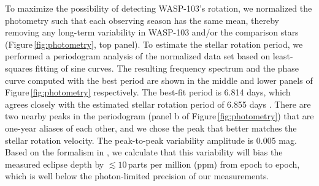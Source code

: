 \documentclass[twocolumn, trackchanges]{aastex61}
\begin{document}

To maximize the possibility of detecting WASP-103's rotation, we normalized the
photometry such that each observing season has the same mean, thereby removing
any long-term variability in WASP-103 and/or the comparison stars
(Figure\,\ref{fig:photometry}, top panel).  To estimate the stellar rotation
period, we performed a periodogram analysis of the normalized data set based on
least-squares fitting of sine curves.  The resulting frequency spectrum and the
phase curve computed with the best period are shown in the middle and lower
panels of Figure\,\ref{fig:photometry} respectively. The best-fit period is
6.814 days, which agrees closely with the estimated stellar rotation period of
6.855 days \citep[based on the projected stellar rotation velocity and stellar
radius reported in][]{gillon14}. There are two nearby peaks in the
periodogram (panel b of Figure\,\ref{fig:photometry}) that are one-year aliases
of each other, and we chose the peak that better matches the stellar rotation velocity. The peak-to-peak variability amplitude is 0.005 mag.  Based on the formalism in \cite{zellem17}, we calculate that this variability will bias the measured eclipse depth by $\lesssim10$\,parts per million (ppm) from epoch to epoch, which is well below the photon-limited precision of our measurements.
\end{document}
